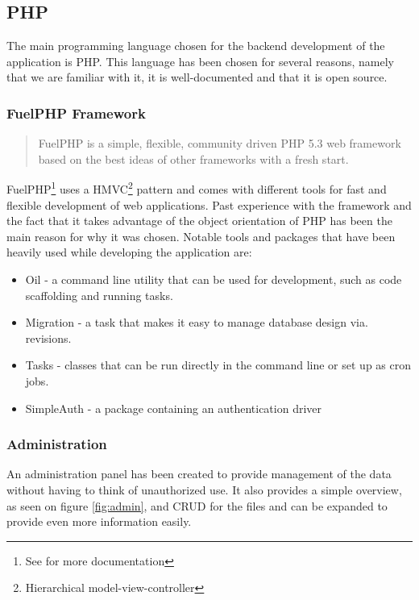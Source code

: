 \subsection{PHP}
\label{sec:php}
The main programming language chosen for the backend development of the application is PHP. This language has been chosen for several reasons, namely that we are familiar with it, it is well-documented and that it is open source.

\subsubsection{FuelPHP Framework}
\label{sec:fuelphp_framework}
\begin{quote}
FuelPHP is a simple, flexible, community driven PHP 5.3 web framework based on the best ideas of other frameworks with a fresh start\cite{FuelPHP}.
\end{quote}

FuelPHP\footnote{See \cite{FuelPHP} for more documentation} uses a HMVC\footnote{Hierarchical model-view-controller} pattern and comes with different tools for fast and flexible development of web applications. Past experience with the framework and the fact that it takes advantage of the object orientation of PHP has been the main reason for why it was chosen. Notable tools and packages that have been heavily used while developing the application are:

\begin{itemize}
\item Oil - a command line utility that can be used for development, such as code scaffolding and running tasks. 
\item Migration - a task that makes it easy to manage database design via. revisions.
\item Tasks - classes that can be run directly in the command line or set up as cron jobs.
\item SimpleAuth - a package containing an authentication driver
\end{itemize}

\subsubsection{Administration}
\label{sec:administration}
An administration panel has been created to provide management of the data without having to think of unauthorized use. It also provides a simple overview, as seen on figure \ref{fig:admin}, and CRUD for the files and can be expanded to provide even more information easily.


